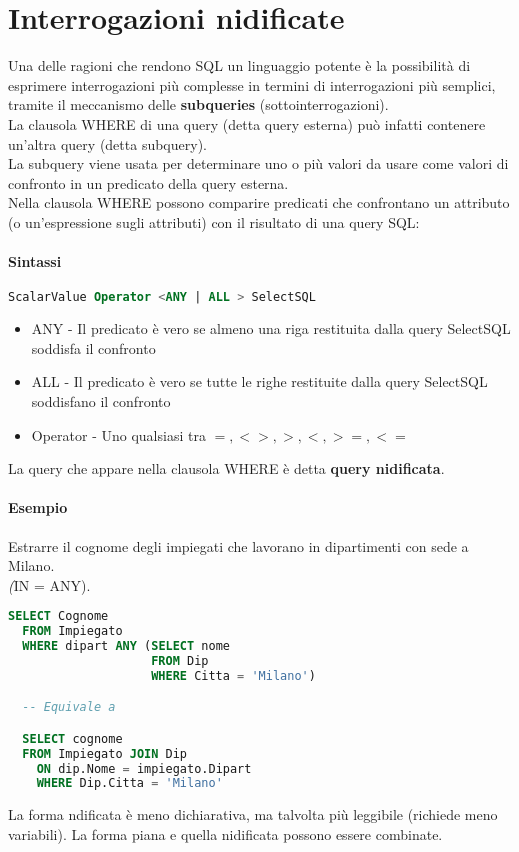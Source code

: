 \section{Interrogazioni nidificate}
Una delle ragioni che rendono SQL un linguaggio potente è la possibilità di esprimere
interrogazioni più complesse in termini di interrogazioni più semplici, tramite il
meccanismo delle \textbf{subqueries} (sottointerrogazioni).\\
La clausola WHERE di una query (detta query esterna) può infatti contenere un'altra
query (detta subquery).\\
La subquery viene usata per determinare uno o più valori da usare come valori di confronto
in un predicato della query esterna.\\
Nella clausola WHERE possono comparire predicati che confrontano un attributo (o un'espressione
sugli attributi) con il risultato di una query SQL:
\paragraph*{Sintassi}
\begin{lstlisting}[language=SQL]
  ScalarValue Operator <ANY | ALL > SelectSQL
\end{lstlisting}
\begin{itemize}
  \item ANY - Il predicato è vero se almeno una riga restituita dalla query SelectSQL 
  soddisfa il confronto
  \item ALL - Il predicato è vero se tutte le righe restituite dalla query SelectSQL soddisfano il
  confronto
  \item Operator - Uno qualsiasi tra $=, <>, >, <, >=, <=$
\end{itemize}
La query che appare nella clausola WHERE è detta \textbf{query nidificata}.\\
\paragraph*{Esempio} Estrarre il cognome degli impiegati che lavorano in dipartimenti con
sede a Milano.\\
\textit(IN = ANY).
\begin{lstlisting}[language=SQL]
  SELECT Cognome
  FROM Impiegato
  WHERE dipart ANY (SELECT nome
                    FROM Dip
                    WHERE Citta = 'Milano')

  -- Equivale a

  SELECT cognome
  FROM Impiegato JOIN Dip
    ON dip.Nome = impiegato.Dipart
    WHERE Dip.Citta = 'Milano'
\end{lstlisting}
La forma ndificata è meno dichiarativa, ma talvolta  più leggibile (richiede meno variabili).
La forma piana e quella nidificata possono essere combinate.
